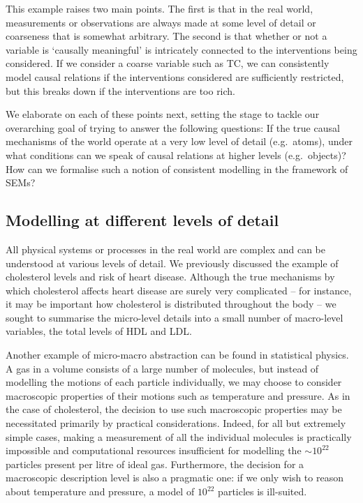 This example raises two main points. The first is that in the real world, measurements or observations are always made at some level of detail or coarseness that is somewhat arbitrary.
The second is that whether or not a variable is `causally meaningful' is intricately connected to the interventions being considered. If we consider a coarse variable such as TC, we can consistently model causal relations if the interventions considered are sufficiently restricted, but this breaks down if the interventions are too rich. 

We elaborate on each of these points next, 
setting the stage to tackle our overarching goal of trying to answer the following questions:
If the true causal mechanisms of the world operate at a very low level of detail (e.g.~atoms), under what conditions can we speak of causal relations at higher levels (e.g.~objects)?
How can we formalise such a notion of consistent modelling in the framework of SEMs?


\subsection{Modelling at different levels of detail}\label{subsec:causality-modelling-different-levels}

All physical systems or processes in the real world are complex and can be understood at various levels of detail.
We previously discussed the example of cholesterol levels and risk of heart disease.
Although the true mechanisms by which cholesterol affects heart disease are surely very complicated -- for instance, it may be important how cholesterol is distributed throughout the body -- we sought to summarise the micro-level details into a small number of macro-level variables, the total levels of HDL and LDL.

Another example of micro-macro abstraction 
can be found in statistical physics.
A gas in a volume consists of a large number of molecules, but instead of modelling the motions of each particle individually, we may choose to consider macroscopic properties of their motions such as temperature and pressure.
As in the case of cholesterol, the decision to use such macroscopic properties may be necessitated primarily by practical considerations.
Indeed, for all but extremely simple cases, making a measurement of all the individual molecules is practically impossible and computational resources insufficient for modelling the ${\sim}10^{22}$ particles present per litre of ideal gas.
Furthermore, the decision for a macroscopic description level is also a pragmatic one: if we only wish to reason about temperature and pressure, a model of $10^{22}$ particles is ill-suited.


